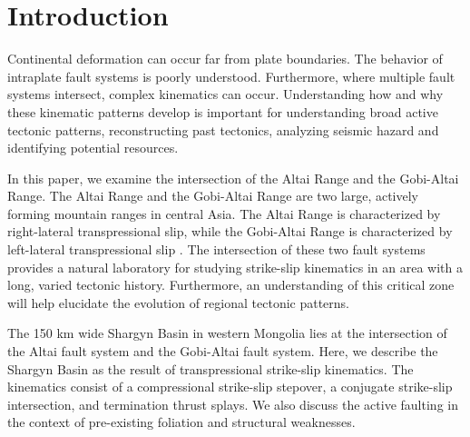 \section{Introduction}
	Continental deformation can occur far from plate boundaries. The behavior of intraplate fault systems is poorly understood. Furthermore, where multiple fault systems intersect, complex kinematics can occur. Understanding how and why these kinematic patterns develop is important for understanding broad active tectonic patterns, reconstructing past tectonics, analyzing seismic hazard and identifying potential resources. 

	In this paper, we examine the intersection of the Altai Range and the Gobi-Altai Range. The Altai Range and the Gobi-Altai Range are two large, actively forming mountain ranges in central Asia. The Altai Range is characterized by right-lateral transpressional slip, while the Gobi-Altai Range is characterized by left-lateral transpressional slip \citep{Cunningham2005a}\citep{Cunningham2010}. The intersection of these two fault systems provides a natural laboratory for studying strike-slip kinematics in an area with a long, varied tectonic history. Furthermore, an understanding of this critical zone will help elucidate the evolution of regional tectonic patterns.

	The 150 km wide Shargyn Basin in western Mongolia lies at the intersection of the Altai fault system and the Gobi-Altai fault system. Here, we describe the Shargyn Basin as the result of transpressional strike-slip kinematics. The kinematics consist of a compressional strike-slip stepover, a conjugate strike-slip intersection, and termination thrust splays. We also discuss the active faulting in the context of pre-existing foliation and structural weaknesses.


